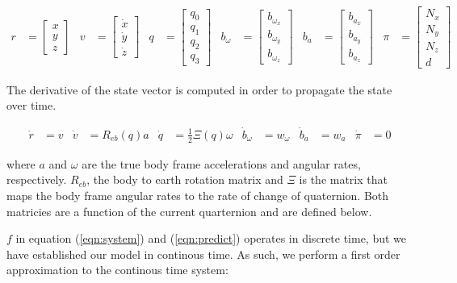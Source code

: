 \documentclass[]{article}
\begin{document}
{\begin{align}
	r &= 
	\left[
	\begin{matrix}
		x \\
		y \\
		z
	\end{matrix}
	\right]
	&
	v &=
	\left[
	\begin{matrix}
		\dot{x} \\
		\dot{y} \\
		\dot{z}
	\end{matrix}
	\right]
	&
	q &=
	\left[
	\begin{matrix}
		q_0 \\
		q_1 \\
		q_2 \\
		q_3
	\end{matrix}
	\right]
	&
	b_\omega &=
	\left[
	\begin{matrix}
		b_{\omega_x} \\
		b_{\omega_y} \\
		b_{\omega_z} 
	\end{matrix}
	\right]
	&
	b_a &=
	\left[
	\begin{matrix}
		b_{a_x} \\
		b_{a_y} \\
		b_{a_z} 
	\end{matrix}
	\right]
	&
	\pi &=
	\left[
	\begin{matrix}
		N_x \\
		N_y \\
		N_z \\
		d
	\end{matrix}
	\right]
\end{align}

The derivative of the state vector is computed in order to propagate the state over time.

\begin{align}
	\dot{r} &= v
	&
	\dot{v} &= R_{eb}(q) a
	&
	\dot{q} &= \frac{1}{2}\Xi(q) \omega
	&
	\dot{b}_\omega &= w_\omega
	&
	\dot{b}_a &= w_a
	&
	\dot{\pi} &= 0
\end{align}

where $a$ and $\omega$ are the true body frame accelerations and angular rates, respectively.
$R_{eb}$, the body to earth rotation matrix and $\Xi$ is the matrix that maps the body frame angular rates to the rate of change of quaternion. Both matricies are a function of the current quarternion and are defined below.

$f$ in equation (\ref{eqn:system}) and (\ref{eqn:predict}) operates in discrete time, but we have established our model in continous time. As such, we perform a first order approximation to the continous time system:

}
\end{document}
